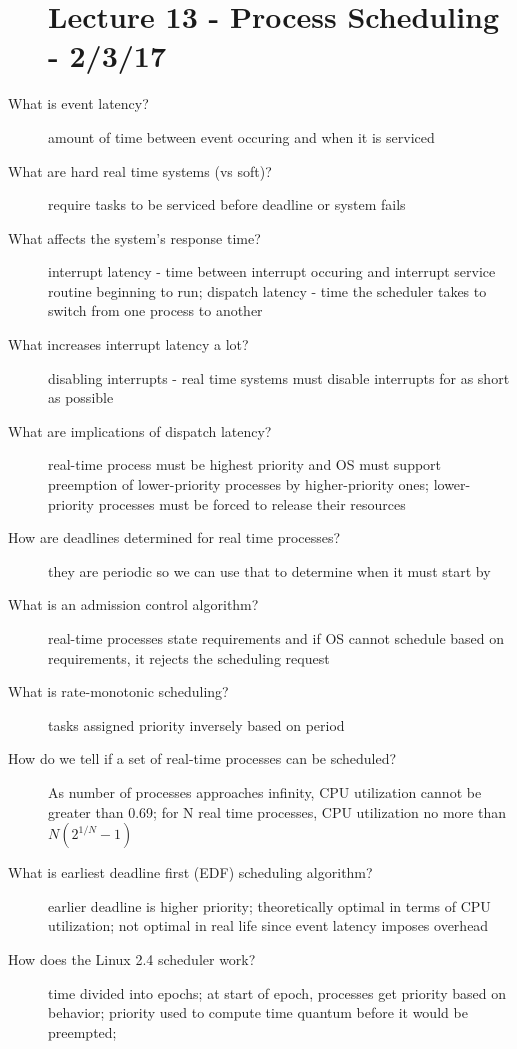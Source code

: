 \documentclass[10pt]{article}
\begin{document}
\begin{description}
\section{Lecture 13 - Process Scheduling - 2/3/17}
\item[What is event latency?]
  amount of time between event occuring and when it is serviced
\item[What are hard real time systems (vs soft)?]
  require tasks to be serviced before deadline or system fails
\item[What affects the system's response time?]
  interrupt latency - time between interrupt occuring and interrupt service routine beginning to run;
  dispatch latency - time the scheduler takes to switch from one process to another
\item[What increases interrupt latency a lot?]
  disabling interrupts - real time systems must disable interrupts for as short as possible
\item[What are implications of dispatch latency?]
  real-time process must be highest priority and OS must support preemption of lower-priority processes by higher-priority ones;
  lower-priority processes must be forced to release their resources
\item[How are deadlines determined for real time processes?]
  they are periodic so we can use that to determine when it must start by
\item[What is an admission control algorithm?]
  real-time processes state requirements and if OS cannot schedule based on requirements, it rejects the scheduling request
\item[What is rate-monotonic scheduling?]
  tasks assigned priority inversely based on period
\item[How do we tell if a set of real-time processes can be scheduled?]
  As number of processes approaches infinity, CPU utilization cannot be greater than 0.69;
  for N real time processes, CPU utilization no more than $N(2^{1/N} - 1)$
\item[What is earliest deadline first (EDF) scheduling algorithm?]
  earlier deadline is higher priority; theoretically optimal in terms of CPU utilization;
  not optimal in real life since event latency imposes overhead
\item[How does the Linux 2.4 scheduler work?]
  time divided into epochs; at start of epoch, processes get priority based on behavior;
  priority used to compute time quantum before it would be preempted;

\end{description}
\end{document}
